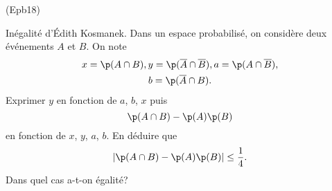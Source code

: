\begin{tiny}(Epb18)\end{tiny} Inégalité d'\'Edith Kosmanek. Dans un espace probabilisé, on considère deux événements $A$ et $B$. On note
\begin{multline*}
  x= \p(A\cap B), y= \p(\overline{A}\cap \overline{B}), a= \p(A\cap \overline{B}),\\
  b = \p(\overline{A}\cap B).
\end{multline*}
Exprimer $y$ en fonction de $a$, $b$, $x$ puis 
\begin{displaymath}
  \p(A\cap B) - \p(A)\p(B)
\end{displaymath}
en fonction de $x$, $y$, $a$, $b$. En déduire que 
\begin{displaymath}
  \left| \p(A\cap B) - \p(A)\p(B)\right| \leq \frac{1}{4}.
\end{displaymath}
Dans quel cas a-t-on égalité?
